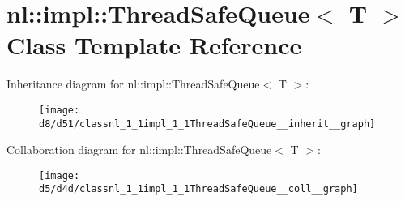 \hypertarget{classnl_1_1impl_1_1ThreadSafeQueue}{}\section{nl\+:\+:impl\+:\+:Thread\+Safe\+Queue$<$ T $>$ Class Template Reference}
\label{classnl_1_1impl_1_1ThreadSafeQueue}


Inheritance diagram for nl\+:\+:impl\+:\+:Thread\+Safe\+Queue$<$ T $>$\+:\nopagebreak
\begin{figure}[H]
\begin{center}
\leavevmode
\texttt{[image: d8/d51/classnl\_1\_1impl\_1\_1ThreadSafeQueue\_\_inherit\_\_graph]}
\end{center}
\end{figure}


Collaboration diagram for nl\+:\+:impl\+:\+:Thread\+Safe\+Queue$<$ T $>$\+:\nopagebreak
\begin{figure}[H]
\begin{center}
\leavevmode
\texttt{[image: d5/d4d/classnl\_1\_1impl\_1\_1ThreadSafeQueue\_\_coll\_\_graph]}
\end{center}
\end{figure}
